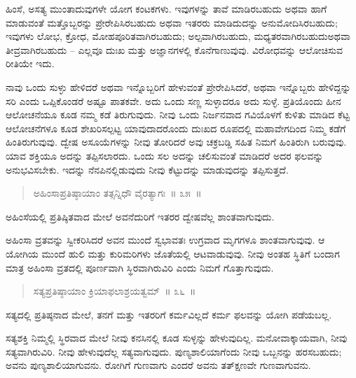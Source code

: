 \vspace{-0.3cm}

ಹಿಂಸೆ, ಅಸತ್ಯ ಮುಂತಾದುವುಗಳೇ ಯೋಗ ಕಂಟಕಗಳು. ಇವುಗಳನ್ನು ತಾವೆ ಮಾಡಿರಬಹುದು ಅಥವಾ ಹಾಗೆ ಮಾಡುವಂತೆ ಮತ್ತೊಬ್ಬರನ್ನು ಪ್ರೇರೇಪಿಸಿರಬಹುದು ಅಥವಾ ಇತರರು ಮಾಡಿದುದನ್ನು ಅನುಮೋದಿಸಿರಬಹುದು; ಇವುಗಳು ಲೋಭ, ಕ್ರೋಧ, ಮೋಹಪೂರಿತವಾಗಿರಬಹುದು; ಅಲ್ಪವಾಗಿರಬಹುದು, ಮಧ್ಯತರವಾಗಿರಬಹುದು\break ಅಥವಾ ತೀವ್ರವಾಗಿರಬಹುದು – ಎಲ್ಲವೂ ದುಃಖ ಮತ್ತು ಅಜ್ಞಾನಗಳಲ್ಲಿ ಕೊನೆಗಾಣುವುವು. ವಿರೋಧವನ್ನು ಆಲೋಚಿಸುವ ರೀತಿಯೇ ಇದು. 

ನಾವು ಒಂದು ಸುಳ್ಳು ಹೇಳಿದರೆ ಅಥವಾ ಇನ್ನೊಬ್ಬರಿಗೆ ಹೇಳುವಂತೆ ಪ್ರೇರೇಪಿಸಿದರೆ, ಅಥವಾ ಇನ್ನೊಬ್ಬರು ಹೇಳಿದ್ದನ್ನು ಸರಿ ಎಂದು ಒಪ್ಪಿಕೊಂಡರೆ ಅಷ್ಟೂ ಪಾತಕವೇ. ಅದು ಒಂದು ಸಣ್ಣ ಸುಳ್ಳಾದರೂ ಅದು ಸುಳ್ಳೆ. ಪ್ರತಿಯೊಂದು ಹೀನ ಆಲೋಚನೆಯೂ ಕೂಡ ನಮ್ಮ ಕಡೆ ತಿರುಗುವುದು. ನೀವು ಒಂದು ನಿರ್ಜನವಾದ ಗವಿಯೊಳಗೆ ಕುಳಿತು ಮಾಡಿದ ಕೆಟ್ಟ ಆಲೋಚನೆಗಳೂ ಕೂಡ ಶೇಖರಿಸಲ್ಪಟ್ಟ ಯಾವುದಾದರೊಂದು ದುಃಖದ ರೂಪದಲ್ಲಿ ಮಹಾವೇಗದಿಂದ ನಿಮ್ಮ ಕಡೆಗೆ ಹಿಂತಿರುಗುವುವು. ದ್ವೇಷ ಅಸೂಯೆಗಳನ್ನು ನೀವು ತೋರಿದರೆ ಅವು ಚಕ್ರಬಡ್ಡಿ ಸಹಿತ ನಿಮಗೆ ಹಿಂತಿರುಗಿ ಬರುವುವು. ಯಾವ ಶಕ್ತಿಯೂ ಅದನ್ನು ತಪ್ಪಿಸಲಾರದು. ಒಂದು ಸಲ ಅದನ್ನು ಚಲಿಸುವಂತೆ ಮಾಡಿದರೆ ಅದರ ಫಲವನ್ನು ಅನುಭವಿಸಬೇಕು. ಇದನ್ನು ನೆನಪಿನಲ್ಲಿಡುವುದು ನೀವು ಕೆಟ್ಟುದನ್ನು ಮಾಡುವುದನ್ನು ತಪ್ಪಿಸುತ್ತದೆ. 

\vspace{-0.3cm}

\begin{verse}
ಅಹಿಂಸಾಪ್ರತಿಷ್ಠಾಯಾಂ ತತ್ಸನ್ನಿಧೌ ವೈರತ್ಯಾಗಃ~॥ ೩೫~॥
\end{verse}

\vspace{-0.3cm}

ಅಹಿಂಸೆಯಲ್ಲಿ ಪ್ರತಿಷ್ಠಿತವಾದ ಮೇಲೆ ಅವನೆದುರಿಗೆ ಇತರರ ದ್ವೇಷವೆಲ್ಲ ಶಾಂತವಾಗುವುದು. 

ಅಹಿಂಸಾ ವ್ರತವನ್ನು ಸ್ವೀಕರಿಸಿದರೆ ಅವನ ಮುಂದೆ ಸ್ವಭಾವತಃ ಉಗ್ರವಾದ ಮೃಗಗಳೂ ಶಾಂತವಾಗುವುವು. ಆ ಯೋಗಿಯ ಮುಂದೆ ಹುಲಿ ಮತ್ತು ಕುರಿಮರಿಗಳು ಜೊತೆಯಲ್ಲಿ ಆಟವಾಡುವುವು. ನೀವು ಅಂತಹ ಸ್ಥಿತಿಗೆ ಬಂದಾಗ ಮಾತ್ರ ಅಹಿಂಸಾ ವ್ರತದಲ್ಲಿ ಪೂರ್ಣವಾಗಿ ಸ್ಥಿರವಾಗಿರುವಿರಿ ಎಂದು ನಿಮಗೆ ಗೊತ್ತಾಗುವುದು. 

\vspace{-0.3cm}

\begin{verse}
ಸತ್ಯಪ್ರತಿಷ್ಠಾಯಾಂ ಕ್ರಿಯಾಫಲಾಶ್ರಯತ್ವಮ್​~॥ ೩೬~॥
\end{verse}

\vspace{-0.3cm}

ಸತ್ಯದಲ್ಲಿ ಪ್ರತಿಷ್ಠನಾದ ಮೇಲೆ, ತನಗೆ ಮತ್ತು ಇತರರಿಗೆ ಕರ್ಮವಿಲ್ಲದೆ ಕರ್ಮ ಫಲವನ್ನು ಯೋಗಿ ಪಡೆಯಬಲ್ಲ. 

ಸತ್ಯಶಕ್ತಿ ನಿಮ್ಮಲ್ಲಿ ಸ್ಥಿರವಾದ ಮೇಲೆ ನೀವು ಕನಸಿನಲ್ಲಿ ಕೂಡ ಸುಳ್ಳನ್ನು ಹೇಳುವುದಿಲ್ಲ. ಮನೋವಾಕ್ಕಾಯವಾಗಿ, ನೀವು ಸತ್ಯವಾಗಿರುವಿರಿ. ನೀವು ಹೇಳುವುದೆಲ್ಲ ಸತ್ಯವಾಗುವುದು. ಪುಣ್ಯಶಾಲಿಯಾಗೆಂದು ನೀವು ಒಬ್ಬನನ್ನು ಹರಸಬಹುದು; ಅವನು ಪುಣ್ಯಶಾಲಿಯಾಗುವನು. ರೋಗಿಗೆ ಗುಣವಾಗು ಎಂದರೆ ಅವನು ತತ್​ಕ್ಷಣವೇ ಗುಣವಾಗುವನು. 

